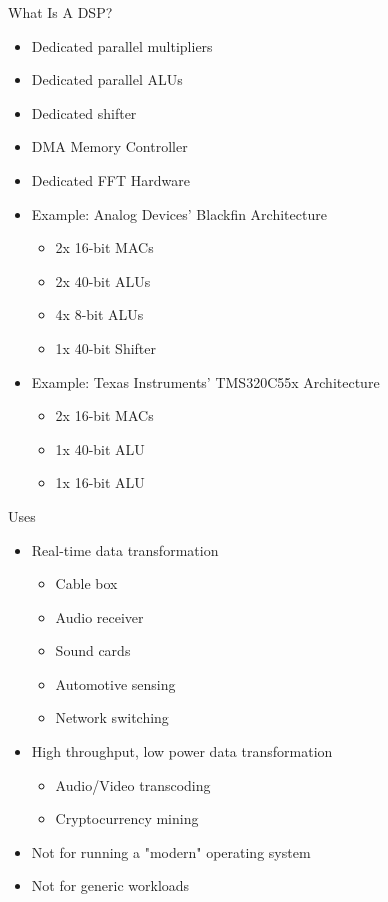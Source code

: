 \documentclass{beamer}
\begin{document}
\begin{frame}{What Is A DSP?}
    \begin{itemize}
        \item Dedicated parallel multipliers
        \item Dedicated parallel ALUs
        \item Dedicated shifter
        \item DMA Memory Controller
        \item Dedicated FFT Hardware
        \item Example: Analog Devices' Blackfin Architecture
            \begin{itemize}
                \item 2x 16-bit MACs
                \item 2x 40-bit ALUs
                \item 4x 8-bit ALUs
                \item 1x 40-bit Shifter
            \end{itemize}
        \item Example: Texas Instruments' TMS320C55x Architecture
            \begin{itemize}
                \item 2x 16-bit MACs
                \item 1x 40-bit ALU
                \item 1x 16-bit ALU
            \end{itemize}
    \end{itemize}
\end{frame}

\begin{frame}{Uses}
    \begin{itemize}
        \item Real-time data transformation
            \begin{itemize}
                \item Cable box
                \item Audio receiver
                \item Sound cards
                \item Automotive sensing
                \item Network switching
            \end{itemize}
        \item High throughput, low power data transformation
            \begin{itemize}
                \item Audio/Video transcoding
                \item Cryptocurrency mining
            \end{itemize}
        \item Not for running a "modern" operating system %
        \item Not for generic workloads %
    \end{itemize}
\end{frame}
\end{document}
